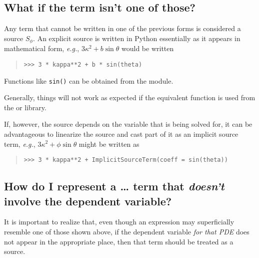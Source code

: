             \subsection{What if the term isn't one of those?}
            Any term that cannot be written in one of the previous
            forms is considered a source $S_{\phi}$. An explicit
            source is written in Python essentially as it appears in
            mathematical form, \emph{e.g.}, $3\kappa^2 + b \sin
            \theta$ would be written
            \begin{quote}
\begin{verbatim}
>>> 3 * kappa**2 + b * sin(theta)
\end{verbatim}
            \end{quote}
            
            \begin{reSTadmonition}[Note]
                Functions like \verb+sin()+ can be obtained from the
                 module.
                \begin{reSTadmonition}[Warning]
                    Generally, things will not work as expected if the
                    equivalent function is used from the \NumPy{} or \SciPy{}
                    library.
                \end{reSTadmonition}
            \end{reSTadmonition}
            
            If, however, the source depends on the variable that is being solved for,
            it can be advantageous to linearize the source and cast part of it as an
            implicit source term, \emph{e.g.}, $3\kappa^2 + \phi \sin \theta$
            might be written as
            \begin{quote}
\begin{verbatim}
>>> 3 * kappa**2 + ImplicitSourceTerm(coeff = sin(theta))
\end{verbatim}
            \end{quote}
            
            \subsection{How do I represent a \dots{} term that 
            \emph{doesn't} involve the dependent variable?}
            It is important to realize that, even though an expression may
            superficially resemble one of those shown above, if the
            dependent variable \emph{for that PDE} does not appear in the
            appropriate place, then that term should be treated as a source.

